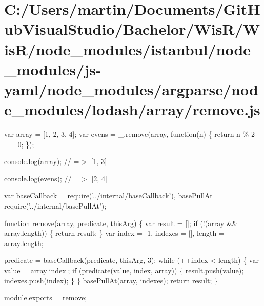 \hypertarget{_c_1_2_users_2martin_2_documents_2_git_hub_visual_studio_2_bachelor_2_wis_r_2_wis_r_2node_module9b95b974e16fbfaf17479cefaa7a056f}{}\section{C\+:/\+Users/martin/\+Documents/\+Git\+Hub\+Visual\+Studio/\+Bachelor/\+Wis\+R/\+Wis\+R/node\+\_\+modules/istanbul/node\+\_\+modules/js-\/yaml/node\+\_\+modules/argparse/node\+\_\+modules/lodash/array/remove.\+js}
var array = \mbox{[}1, 2, 3, 4\mbox{]}; var evens = \+\_\+.\+remove(array, function(n) \{ return n \% 2 == 0; \});

console.\+log(array); // =$>$ \mbox{[}1, 3\mbox{]}

console.\+log(evens); // =$>$ \mbox{[}2, 4\mbox{]}


\begin{DoxyCodeInclude}
var baseCallback = require(\textcolor{stringliteral}{'../internal/baseCallback'}),
    basePullAt = require(\textcolor{stringliteral}{'../internal/basePullAt'});

\textcolor{keyword}{function} \textcolor{keyword}{remove}(array, predicate, thisArg) \{
  var result = [];
  \textcolor{keywordflow}{if} (!(array && array.length)) \{
    \textcolor{keywordflow}{return} result;
  \}
  var index = -1,
      indexes = [],
      length = array.length;

  predicate = baseCallback(predicate, thisArg, 3);
  \textcolor{keywordflow}{while} (++index < length) \{
    var value = array[index];
    \textcolor{keywordflow}{if} (predicate(value, index, array)) \{
      result.push(value);
      indexes.push(index);
    \}
  \}
  basePullAt(array, indexes);
  \textcolor{keywordflow}{return} result;
\}

module.exports = \textcolor{keyword}{remove};
\end{DoxyCodeInclude}
 